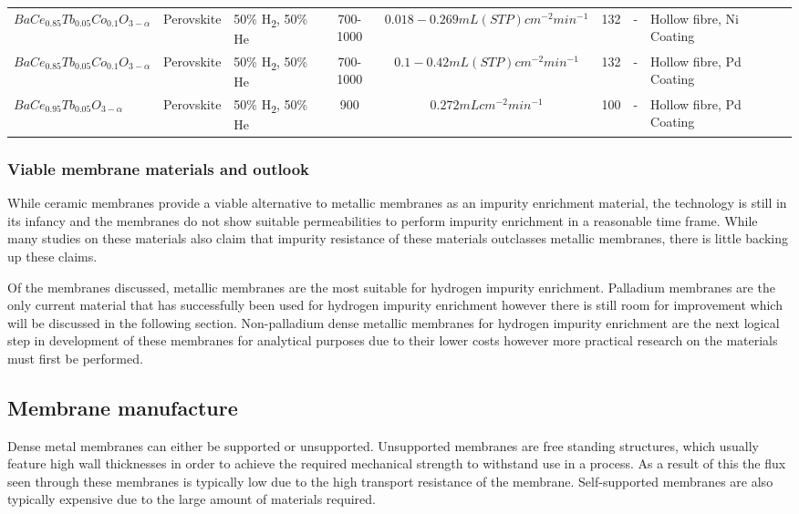 \begin{longtable}{@{}C{5cm} C{2cm} C{4cm} ccc C{6cm} C{5cm} C{0.5cm} @{}}
\\ $BaCe_{0.85}Tb_{0.05}Co_{0.1}O_{3-\alpha}	$
    & Perovskite	
    & 50\% H\textsubscript{2}, 50\% He
    & 700-1000	
    & $0.018 - 0.269 mL (STP) cm^{-2} min^{-1}	$
    & 132	
    & -	
    & Hollow fibre, Ni Coating	
    & \cite{Song2015a}

\\ $BaCe_{0.85}Tb_{0.05}Co_{0.1}O_{3-\alpha}$	
    & Perovskite	
    & 50\% H\textsubscript{2}, 50\% He
    & 700-1000	
    & $0.1 - 0.42 mL (STP) cm^{-2} min^{-1}$	
    & 132	
    & -	
    & Hollow fibre, Pd Coating	
    & \cite{Song2015a}

\\ $BaCe_{0.95}Tb_{0.05}O_{3-\alpha}$	
    & Perovskite	
    & 50\% H\textsubscript{2}, 50\% He
    & 900	
    & $0.272 mL cm^{-2} min^{-1}$	
    & 100	
    & -	
    & Hollow fibre, Pd Coating	
    & \cite{Song2015}

    
    \\ \bottomrule
    \end{longtable}

    \eject \pdfpagewidth=8.3in \pdfpageheight=11.7in


\subsubsection{Viable membrane materials and outlook}


While ceramic membranes provide a viable alternative to metallic membranes as an impurity 
enrichment material, the technology is still in its infancy and the membranes do not show 
suitable permeabilities to perform impurity enrichment in a reasonable time frame. While many 
studies on these materials also claim that impurity resistance of these materials outclasses 
metallic membranes, there is little backing up these claims.  

Of the membranes discussed, metallic membranes are the most suitable for hydrogen impurity 
enrichment.  Palladium membranes are the only current material that has successfully been 
used for hydrogen impurity enrichment however there is still room for improvement which will 
be discussed in the following section. Non-palladium dense metallic membranes for hydrogen 
impurity enrichment are the next logical step in development of these membranes for 
analytical purposes due to their lower costs however more practical research on the materials 
must first be performed.

\subsection{Membrane manufacture}
Dense metal membranes can either be supported or unsupported. Unsupported membranes are free 
standing structures, which usually feature high wall thicknesses in order to achieve the 
required mechanical strength to withstand use in a process. As a result of this the flux 
seen through these membranes is typically low due to the high transport resistance of the 
membrane. Self-supported membranes are also typically expensive due to the large amount of 
materials required. \cite{NathanW.Ockwig2007a}

